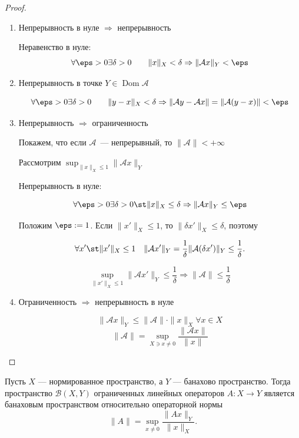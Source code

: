 \begin{proof}
	
	\begin{enumerate}
		\item Непрерывность в нуле $\Rightarrow$ непрерывность
		
		Неравенство в нуле:
		\[ \forall  \eps  >  0  \exists  \delta  >  0 \qquad  \|x\| _X  <  \delta \Rightarrow  \|\mathcal{A}x\| _Y  <  \eps \]
		
		\item Непрерывность в точке $Y \in \operatorname{Dom} \mathcal{A}$
		
		\[ \forall  \eps  >  0  \exists  \delta  >  0 \qquad  \|y-x\| _X  <  \delta \Rightarrow  \|\mathcal{A}y - \mathcal{A}x\|  =  \|\mathcal{A}(y-x)\|   <  \eps \]
		
		\item Непрерывность $\Rightarrow$ ограниченность
		
		Покажем, что если $\mathcal{A}$~--- непрерывный, то $ \|\mathcal{A}\|   <  + \infty$
		
		Рассмотрим $\sup_{ \|x\| _X \le 1}  \|\mathcal{A}x\| _Y$
		
		Непрерывность в нуле: 
		
		\[ \forall  \eps  >  0  \exists  \delta  >  0 \st  \|x\| _X \le \delta \Rightarrow  \|\mathcal{A}x\| _Y \le \eps \]
		
		Положим $\eps := 1$. Если $\|x'\|_X \le 1$, то $\|\delta x'\|_X \le \delta$, поэтому
		
		\[ \forall x' \st \|x'\|_X \le 1 \quad \|\mathcal{A}x'\|_Y = \frac{1}{\delta}\|\mathcal{A}(\delta x')\|_Y \le \frac{1}{\delta}. \]
		
		\[ \sup_{ \|x'\|_X \le 1}  \|\mathcal{A}x'\| _Y \le \frac{1}{\delta} \Rightarrow  \|\mathcal{A}\|  \le \frac{1}{\delta} \]
		
		\item Ограниченность $\Rightarrow$ непрерывность в нуле
		
		\[  \|\mathcal{A} x\|_Y \le  \|\mathcal{A} \|\cdot\| x \|_X  \forall  x \in X \]
		\[ \|\mathcal{A}\| = \sup_{X \ni x \neq 0} \frac{\|\mathcal{A}x\|}{\|x\|} \]
	\end{enumerate}
\end{proof}

\begin{Theorem}
	Пусть $X$ --- нормированное пространство, а $Y$ --- банахово пространство.
	Тогда пространство $\mathcal B(X,Y)$ ограниченных линейных операторов
	$A:X\to Y$ является банаховым пространством относительно операторной нормы
	\[
	\|A\|=\sup_{x\ne 0}\frac{\|Ax\|_Y}{\|x\|_X}.
	\]
\end{Theorem}


